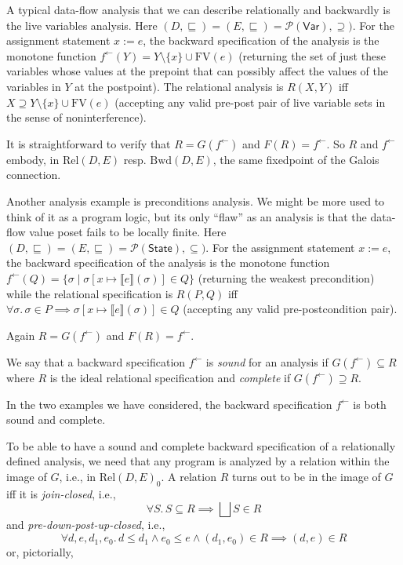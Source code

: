 \documentclass{llncs}
\newcommand{\Pow}{\mathcal{P}}
\newcommand{\Rel}{\mathrm{Rel}}
\newcommand{\Bwd}{\mathrm{Bwd}}
\newcommand{\fb}{{f^{\leftarrow}}}
\newcommand{\bigjoin}{\bigsqcup}
\newcommand{\rotleq}{\rotatebox[origin=c]{90}{$\leq$}}
\newcommand{\Var}{\mathsf{Var}}
\newcommand{\State}{\mathsf{State}}
\newcommand{\FV}{\mathrm{FV}}
\newcommand{\sqleq}{\sqsubseteq}
\begin{document}
A typical data-flow analysis that we can describe relationally and
backwardly is the live variables analysis. Here
$(D, \sqleq) = (E, \sqleq) = \Pow(\Var), \supseteq)$. For the
assignment statement $x := e$, the backward specification of the
analysis is the monotone function
$\fb (Y) = Y \setminus \{x\} \cup \FV(e)$ (returning the set of just
these variables whose values at the prepoint that can possibly affect
the values of the variables in $Y$ at the postpoint).  The relational
analysis is $R(X,Y)$ iff $X \supseteq Y \setminus \{x\} \cup \FV(e)$
(accepting any valid pre-post pair of live variable sets in the sense
of noninterference).

It is straightforward to verify that $R = G(\fb)$ and $F(R) = \fb$.  So
$R$ and $\fb$ embody, in $\Rel(D,E)$ resp. $\Bwd(D,E)$, the same
fixedpoint of the Galois connection.

Another analysis example is preconditions analysis. We might be more
used to think of it as a program logic, but its only ``flaw'' as an
analysis is that the data-flow value poset fails to be locally finite.
Here $(D, \sqleq) = (E, \sqleq) = \Pow(\State), \subseteq)$. For the
assignment statement $x := e$, the backward specification of the
analysis is the monotone function
$\fb (Q) = \{ \sigma \mid \sigma[x \mapsto \llbracket
e\rrbracket(\sigma)] \in Q \}$ (returning the weakest precondition)
while the relational specification is $R(P, Q)$ iff
$\forall \sigma.\, \sigma \in P \implies \sigma[x \mapsto \llbracket
e\rrbracket(\sigma)] \in Q$ (accepting any valid pre-postcondition
pair).

Again $R = G(\fb)$ and $F(R) = \fb$.

We say that a backward specification $\fb$ is \emph{sound} for an
analysis if $G(\fb) \subseteq R$ where $R$ is the ideal relational
specification and \emph{complete} if $G(\fb) \supseteq R$.

In the two examples we have considered, the backward specification
$\fb$ is both sound and complete.

To be able to have a sound and complete backward specification of a
relationally defined analysis, we need that any program is analyzed by
a relation within the image of $G$, i.e., in $\Rel(D,E)_0$.  A
relation $R$ turns out to be in the image of $G$ iff it is
\emph{join-closed}, i.e.,
\[
\forall S.\,  S \subseteq R \implies \bigjoin S \in R
\]  
and \emph{pre-down-post-up-closed}, i.e.,
\[
\forall d, e,d_{1 },e_{0}.\, d \leq d_{1} \land e_{0} \leq e \land
(d_{1}, e_{0}) \in R \implies (d, e) \in R
\]
or, pictorially,
\begin{center}
\end{center}
\end{document}
